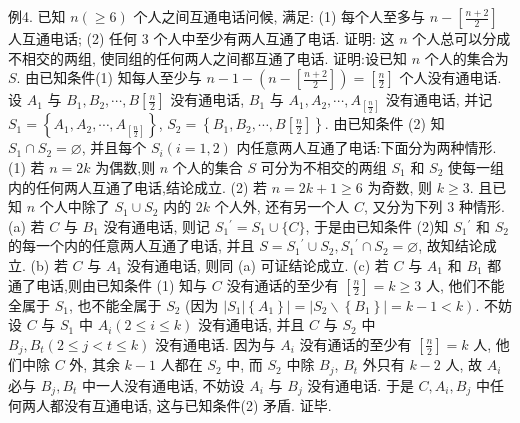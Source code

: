 例4. 已知 $n(\geqslant 6)$ 个人之间互通电话问候, 满足: (1) 每个人至多与 $n- \left[\frac{n+2}{2}\right]$ 人互通电话; (2) 任何 3 个人中至少有两人互通了电话.
证明: 这 $n$ 个人总可以分成不相交的两组, 使同组的任何两人之间都互通了电话.
证明:设已知 $n$ 个人的集合为 $S$. 由已知条件(1) 知每人至少与 $n-1- \left(n-\left[\frac{n+2}{2}\right]\right)=\left[\frac{n}{2}\right]$ 个人没有通电话.
设 $A_1$ 与 $B_1, B_2, \cdots, B\left[\frac{n}{2}\right]$ 没有通电话, $B_1$ 与 $A_1, A_2, \cdots, A_{\left[\frac{n}{2}\right]}$ 没有通电话, 并记 $S_1=\left\{A_1, A_2, \cdots, A_{\left[\frac{n}{2}\right]}\right\}$, $S_2=\left\{B_1, B_2, \cdots, B\left[\frac{n}{2}\right]\right\}$. 由已知条件 (2) 知 $S_1 \cap S_2=\varnothing$, 并且每个 $S_i(i= 1,2)$ 内任意两人互通了电话:下面分为两种情形.
(1) 若 $n=2 k$ 为偶数,则 $n$ 个人的集合 $S$ 可分为不相交的两组 $S_1$ 和 $S_2$ 使每一组内的任何两人互通了电话,结论成立.
(2) 若 $n=2 k+1 \geqslant 6$ 为奇数, 则 $k \geqslant 3$. 且已知 $n$ 个人中除了 $S_1 \cup S_2$ 内的 $2 k$ 个人外, 还有另一个人 $C$, 又分为下列 3 种情形.
(a) 若 $C$ 与 $B_1$ 没有通电话, 则记 $S_1{ }^{\prime}=S_1 \cup\{C\}$, 于是由已知条件 (2)知 $S_1{ }^{\prime}$ 和 $S_2$ 的每一个内的任意两人互通了电话, 并且 $S=S_1{ }^{\prime} \cup S_2, S_1{ }^{\prime} \cap S_2= \varnothing$, 故知结论成立.
(b) 若 $C$ 与 $A_1$ 没有通电话, 则同 (a) 可证结论成立.
(c) 若 $C$ 与 $A_1$ 和 $B_1$ 都通了电话,则由已知条件 (1) 知与 $C$ 没有通话的至少有 $\left[\frac{n}{2}\right]=k \geqslant 3$ 人, 他们不能全属于 $S_1$, 也不能全属于 $S_2$ (因为 $\left|S_1\right| \left.\left\{A_1\right\}|=| S_2 \backslash\left\{B_1\right\} \mid=k-1<k\right)$. 不妨设 $C$ 与 $S_1$ 中 $A_i(2 \leqslant i \leqslant k)$ 没有通电话, 并且 $C$ 与 $S_2$ 中 $B_j, B_t(2 \leqslant j<t \leqslant k)$ 没有通电话.
因为与 $A_i$ 没有通话的至少有 $\left[\frac{n}{2}\right]=k$ 人, 他们中除 $C$ 外, 其余 $k-1$ 人都在 $S_2$ 中, 而 $S_2$ 中除 $B_j$, $B_t$ 外只有 $k-2$ 人, 故 $A_i$ 必与 $B_j, B_t$ 中一人没有通电话, 不妨设 $A_i$ 与 $B_j$ 没有通电话.
于是 $C, A_i, B_j$ 中任何两人都没有互通电话, 这与已知条件(2) 矛盾.
证毕.




